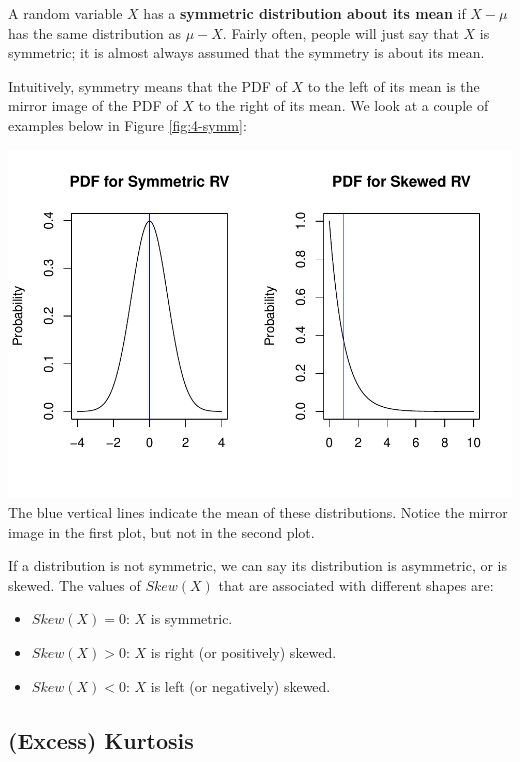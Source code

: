 \documentclass[
]{book}
\providecommand{\tightlist}{%
  \setlength{\itemsep}{0pt}\setlength{\parskip}{0pt}}
\begin{document}
A random variable \(X\) has a \textbf{symmetric distribution about its mean} if \(X - \mu\) has the same distribution as \(\mu - X\). Fairly often, people will just say that \(X\) is symmetric; it is almost always assumed that the symmetry is about its mean.

Intuitively, symmetry means that the PDF of \(X\) to the left of its mean is the mirror image of the PDF of \(X\) to the right of its mean. We look at a couple of examples below in Figure \ref{fig:4-symm}:

\includegraphics{bookdown-demo_files/figure-latex/4-symm-1.pdf}
The blue vertical lines indicate the mean of these distributions. Notice the mirror image in the first plot, but not in the second plot.

If a distribution is not symmetric, we can say its distribution is asymmetric, or is skewed. The values of \(Skew(X)\) that are associated with different shapes are:

\begin{itemize}
\tightlist
\item
  \(Skew(X) = 0\): \(X\) is symmetric.
\item
  \(Skew(X) > 0\): \(X\) is right (or positively) skewed.
\item
  \(Skew(X) < 0\): \(X\) is left (or negatively) skewed.
\end{itemize}

\hypertarget{excess-kurtosis}{%
\subsection{(Excess) Kurtosis}\label{excess-kurtosis}}
\end{document}
